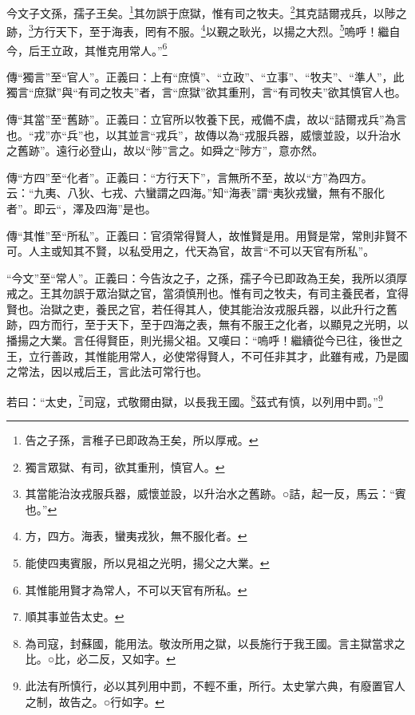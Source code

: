 今文子文孫，孺子王矣。\footnote{告之子孫，言稚子已即政為王矣，所以厚戒。}其勿誤于庶獄，惟有司之牧夫。\footnote{獨言眾獄、有司，欲其重刑，慎官人。}其克詰爾戎兵，以陟之跡，\footnote{其當能治汝戎服兵器，威懷並設，以升治水之舊跡。○詰，起一反，馬云：“賓也。”}方行天下，至于海表，罔有不服。\footnote{方，四方。海表，蠻夷戎狄，無不服化者。}以覲之耿光，以揚之大烈。\footnote{能使四夷賓服，所以見祖之光明，揚父之大業。}嗚呼！繼自今，后王立政，其惟克用常人。”\footnote{其惟能用賢才為常人，不可以天官有所私。}


{\noindent\zhuan{}\fzbyks 傳“獨言”至“官人”。正義曰：上有“庶慎”、“立政”、“立事”、“牧夫”、“準人”，此獨言“庶獄”與“有司之牧夫”者，言“庶獄”欲其重刑，言“有司牧夫”欲其慎官人也。 \par}

{\noindent\zhuan{}\fzbyks 傳“其當”至“舊跡”。正義曰：立官所以牧養下民，戒備不虞，故以“詰爾戎兵”為言也。“戎”亦“兵”也，以其並言“戎兵”，故傳以為“戎服兵器，威懷並設，以升治水之舊跡”。遠行必登山，故以“陟”言之。如舜之“陟方”，意亦然。 \par}

{\noindent\zhuan{}\fzbyks 傳“方四”至“化者”。正義曰：“方行天下”，言無所不至，故以“方”為四方。云：“九夷、八狄、七戎、六蠻謂之四海。”知“海表”謂“夷狄戎蠻，無有不服化者”。即云“，澤及四海”是也。 \par}

{\noindent\zhuan{}\fzbyks 傳“其惟”至“所私”。正義曰：官須常得賢人，故惟賢是用。用賢是常，常則非賢不可。人主或知其不賢，以私受用之，代天為官，故言“不可以天官有所私”。 \par}

{\noindent\shu{}\fzkt “今文”至“常人”。正義曰：今告汝之子，之孫，孺子今已即政為王矣，我所以須厚戒之。王其勿誤于眾治獄之官，當須慎刑也。惟有司之牧夫，有司主養民者，宜得賢也。治獄之吏，養民之官，若任得其人，使其能治汝戎服兵器，以此升行之舊跡，四方而行，至于天下，至于四海之表，無有不服王之化者，以顯見之光明，以播揚之大業。言任得賢臣，則光揚父祖。又嘆曰：“嗚呼！繼續從今已往，後世之王，立行善政，其惟能用常人，必使常得賢人，不可任非其才，此雖有戒，乃是國之常法，因以戒后王，言此法可常行也。 \par}

若曰：“太史，\footnote{順其事並告太史。}司寇，式敬爾由獄，以長我王國。\footnote{為司寇，封蘇國，能用法。敬汝所用之獄，以長施行于我王國。言主獄當求之比。○比，必二反，又如字。}茲式有慎，以列用中罰。”\footnote{此法有所慎行，必以其列用中罰，不輕不重，所行。太史掌六典，有廢置官人之制，故告之。○行如字。}


